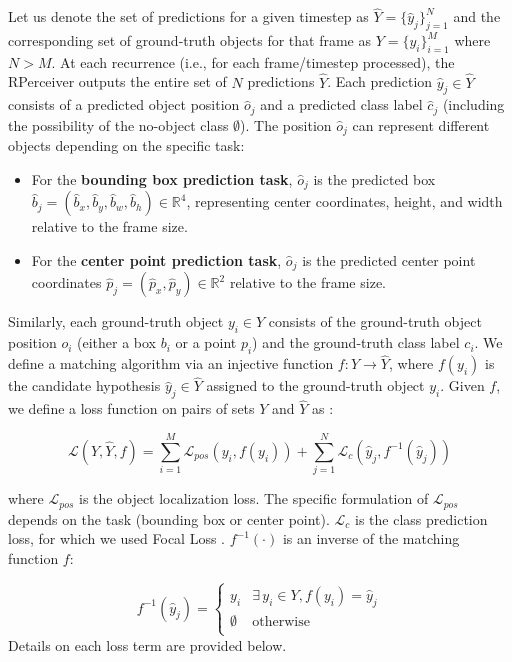 Let us denote the set of predictions for a given timestep as $ \hat{Y} = \{\hat{y}_j\}_{j=1}^N $ and the corresponding set of ground-truth objects for that frame as $ Y = \{y_i\}_{i=1}^M $ where $ N > M $. At each recurrence (i.e., for each frame/timestep processed), the RPerceiver outputs the entire set of $N$ predictions $\hat{Y}$. Each prediction $\hat{y}_j \in \hat{Y}$ consists of a predicted object position $\hat{o}_j$ and a predicted class label $\hat{c}_j$ (including the possibility of the no-object class $\emptyset$). The position $\hat{o}_j$ can represent different objects depending on the specific task:
\begin{itemize}
    \item For the \textbf{bounding box prediction task}, $\hat{o}_j$ is the predicted box $\hat{b}_j = (\hat{b}_x, \hat{b}_y, \hat{b}_w, \hat{b}_h) \in \mathbb{R}^4$, representing center coordinates, height, and width relative to the frame size.
    \item For the \textbf{center point prediction task}, $\hat{o}_j$ is the predicted center point coordinates $\hat{p}_j = (\hat{p}_x, \hat{p}_y) \in \mathbb{R}^2$ relative to the frame size.
\end{itemize}
Similarly, each ground-truth object $y_i \in Y$ consists of the ground-truth object position $o_i$ (either a box $b_i$ or a point $p_i$) and the ground-truth class label $c_i$.
We define a matching algorithm via an injective function $f: Y \rightarrow \hat{Y}$, where $f(y_i)$ is the candidate hypothesis $\hat{y}_j \in \hat{Y}$ assigned to the ground-truth object $y_i$. Given $f$, we define a loss function on pairs of sets $Y$ and $\hat{Y}$ as \cite{stewartEndtoendPeopleDetection2015}:

\begin{equation} \label{eq:set_loss}
\mathcal{L}(Y, \hat{Y}, f ) = \sum_{i=1}^{M} \mathcal{L}_{pos}(y_i, f(y_i)) +  \sum_{j=1}^{N} \mathcal{L}_c (\hat{y}_j, f^{-1}(\hat{y}_j))
\end{equation}

where $\mathcal{L}_{pos}$ is the object localization loss. The specific formulation of $\mathcal{L}_{pos}$ depends on the task (bounding box or center point). $\mathcal{L}_c$ is the class prediction loss, for which we used Focal Loss \cite{linFocalLossDense2018}. $f^{-1}(\cdot)$ is an inverse of the matching function $f$:

\begin{equation*}
f^{-1}(\hat{y}_j) =
\begin{cases}
y_i & \exists \, y_i \in Y, f(y_i) = \hat{y}_j \\
\emptyset & \text{otherwise} \\
\end{cases}
\end{equation*}
Details on each loss term are provided below.


